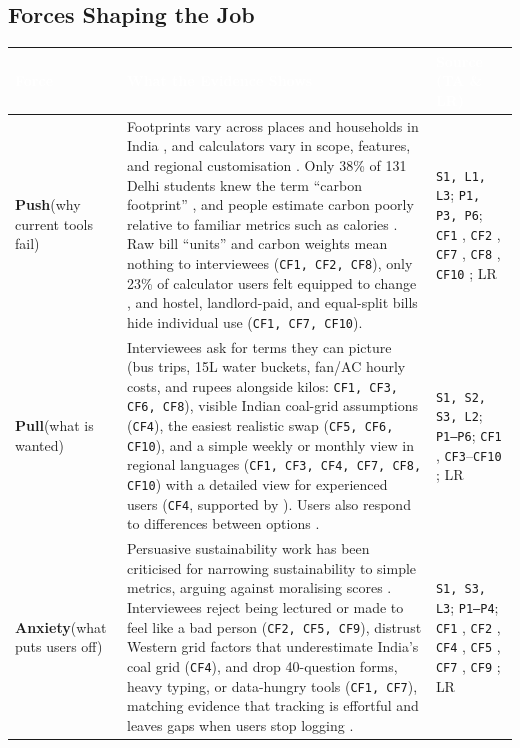 \documentclass[12pt, a4paper]{article}
\begin{document}
\subsection{Forces Shaping the Job}
{\footnotesize
{}
\begin{longtable}{|>{\raggedright\arraybackslash}p{2.5cm}|>{\raggedright\arraybackslash}p{9.2cm}|>{\raggedright\arraybackslash}p{4.3cm}|}
\hline
\rowcolor{cNavy}
\textcolor{white}{\textbf{Force}} & \textcolor{white}{\textbf{What the Evidence Shows}} & \textcolor{white}{\textbf{Source (TA \& LR)}} \\
\hline
\textbf{Push}\newline (why current tools fail) & Footprints vary across places and households in India \cite{lee2021}, and calculators vary in scope, features, and regional customisation \cite{mulrow2019}. Only 38\% of 131 Delhi students knew the term ``carbon footprint'' \cite{gandhi2025}, and people estimate carbon poorly relative to familiar metrics such as calories \cite{grinstein2018}. Raw bill ``units'' and carbon weights mean nothing to interviewees (\texttt{CF1, CF2, CF8}), only 23\% of calculator users felt equipped to change \cite{collins2020}, and hostel, landlord-paid, and equal-split bills hide individual use (\texttt{CF1, CF7, CF10}). & \texttt{S1, L1, L3}; \texttt{P1, P3, P6}; \texttt{CF1} \cite{cf1}, \texttt{CF2} \cite{cf2}, \texttt{CF7} \cite{cf7}, \texttt{CF8} \cite{cf8}, \texttt{CF10} \cite{cf10}; LR \cite{lee2021,gandhi2025,grinstein2018,mulrow2019,collins2020} \\
\hline
\textbf{Pull}\newline (what is wanted) & Interviewees ask for terms they can picture (bus trips, 15L water buckets, fan/AC hourly costs, and rupees alongside kilos: \texttt{CF1, CF3, CF6, CF8}), visible Indian coal-grid assumptions (\texttt{CF4}), the easiest realistic swap (\texttt{CF5, CF6, CF10}), and a simple weekly or monthly view in regional languages (\texttt{CF1, CF3, CF4, CF7, CF8, CF10}) with a detailed view for experienced users (\texttt{CF4}, supported by \cite{hoffmann2024}). Users also respond to differences between options \cite{mohanty2023}. & \texttt{S1, S2, S3, L2}; \texttt{P1--P6}; \texttt{CF1} \cite{cf1}, \texttt{CF3}--\texttt{CF10} \cite{cf3,cf4,cf5,cf6,cf7,cf8,cf9,cf10}; LR \cite{hoffmann2024,mohanty2023} \\
\hline
\textbf{Anxiety}\newline (what puts users off) & Persuasive sustainability work has been criticised for narrowing sustainability to simple metrics, arguing against moralising scores \cite{brynjarsdottir2012}. Interviewees reject being lectured or made to feel like a bad person (\texttt{CF2, CF5, CF9}), distrust Western grid factors that underestimate India's coal grid (\texttt{CF4}), and drop 40-question forms, heavy typing, or data-hungry tools (\texttt{CF1, CF7}), matching evidence that tracking is effortful and leaves gaps when users stop logging \cite{hoffmann2024}. & \texttt{S1, S3, L3}; \texttt{P1--P4}; \texttt{CF1} \cite{cf1}, \texttt{CF2} \cite{cf2}, \texttt{CF4} \cite{cf4}, \texttt{CF5} \cite{cf5}, \texttt{CF7} \cite{cf7}, \texttt{CF9} \cite{cf9}; LR \cite{hoffmann2024,brynjarsdottir2012} \\

\end{longtable}}
\end{document}
